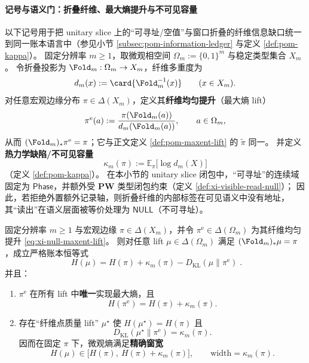 \paragraph{记号与语义门：折叠纤维、最大熵提升与不可见容量}\label{par:xi-null-notation-semantic-gate}
以下记号用于把 unitary slice 上的“可寻址/空值”与窗口折叠的纤维信息缺口统一到同一账本语言中（参见小节 \ref{subsec:pom-information-ledger} 与定义 \ref{def:pom-kappa}）。
固定分辨率 \(m\ge 1\)，取微观相空间 \(\Omega_m:=\{0,1\}^m\) 与稳定类型集合 \(X_m\)。
令折叠投影为 \(\Fold_m:\Omega_m\to X_m\)，纤维多重度为
\[
d_m(x):=\card{\Fold_m^{-1}(x)}\qquad(x\in X_m).
\]
对任意宏观边缘分布 \(\pi\in\Delta(X_m)\)，定义其\textbf{纤维均匀提升}（最大熵 lift）
\begin{equation}\label{eq:xi-null-maxent-lift}
\pi^{\mathrm{e}}(a):=\frac{\pi(\Fold_m(a))}{d_m(\Fold_m(a))},\qquad a\in\Omega_m,
\end{equation}
从而 \((\Fold_m)_*\pi^{\mathrm{e}}=\pi\)；它与正文定义 \ref{def:pom-maxent-lift} 的 \(\widetilde\pi\) 同一。
并定义\textbf{热力学缺陷/不可见容量}
\[
\kappa_m(\pi):=\mathbb{E}_{\pi}\bigl[\log d_m(X)\bigr]
\]
（定义 \ref{def:pom-kappa}）。
在本小节的 unitary slice 闭包中，“可寻址”的连续域固定为 \(\mathsf{Phase}\)，并额外受 \(\mathbf{PW}\) 类型闭包约束（定义 \ref{def:xi-visible-read-null}）；
因此，若拒绝外置额外记录轴，则折叠纤维的内部标签在可见语义中没有地址，其“读出”在语义层面被等价处理为 \(\mathsf{NULL}\)（不可寻址）。

\begin{theorem}\label{thm:xi-null-fiber-entropy-window}
固定分辨率 \(m\ge 1\) 与宏观边缘 \(\pi\in\Delta(X_m)\)，并令 \(\pi^{\mathrm{e}}\in\Delta(\Omega_m)\) 为其纤维均匀提升 \eqref{eq:xi-null-maxent-lift}。
则对任意 lift \(\mu\in\Delta(\Omega_m)\) 满足 \((\Fold_m)_*\mu=\pi\)，成立严格账本恒等式
\[
\boxed{\;
H(\mu)=H(\pi)+\kappa_m(\pi)-D_{\mathrm{KL}}(\mu\|\pi^{\mathrm{e}})\; }.
\]
并且：
\begin{enumerate}
  \item \(\pi^{\mathrm{e}}\) 在所有 lift 中\textbf{唯一}实现最大熵，且
  \[
  H(\pi^{\mathrm{e}})=H(\pi)+\kappa_m(\pi).
  \]
  \item 存在“纤维点质量 lift” \(\mu^\star\) 使 \(H(\mu^\star)=H(\pi)\) 且
  \[
  D_{\mathrm{KL}}(\mu^\star\|\pi^{\mathrm{e}})=\kappa_m(\pi).
  \]
  因而在固定 \(\pi\) 下，微观熵满足\textbf{精确窗宽}
  \[
  H(\mu)\in\bigl[H(\pi),\ H(\pi)+\kappa_m(\pi)\bigr],
  \qquad
  \mathrm{width}=\kappa_m(\pi).
  \]
\end{enumerate}
\end{theorem}

